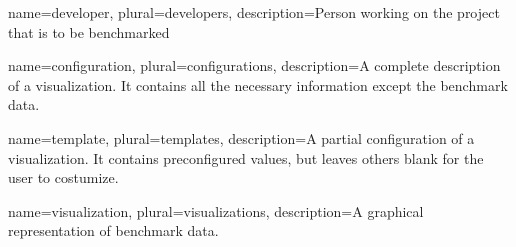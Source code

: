 \makenoidxglossaries

{
	name=developer,
	plural=developers,
	description={Person working on the project that is to be benchmarked}
}

{
	name=configuration,
	plural=configurations,
	description={A complete description of a \gls{visualization}. It contains all the necessary information except the benchmark data.}
}

{
	name=template,
	plural=templates,
	description={A partial configuration of a \gls{visualization}. It contains preconfigured values, but leaves others blank for the user to costumize.}
}

{
	name=visualization,
	plural=visualizations,
	description={A graphical representation of benchmark data.}
}


